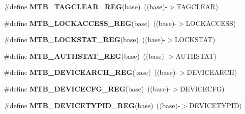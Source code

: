 \begin{DoxyCompactItemize}
\item 
\mbox{\label{group___m_t_b___register___accessor___macros_ga14fdf038658b290f905867b2b745c629}} 
\#define {\bfseries M\+T\+B\+\_\+\+T\+A\+G\+C\+L\+E\+A\+R\+\_\+\+R\+EG}(base)~((base)-\/$>$T\+A\+G\+C\+L\+E\+AR)
\item 
\mbox{\label{group___m_t_b___register___accessor___macros_gaf0943d71afa518f65cec97557400a04a}} 
\#define {\bfseries M\+T\+B\+\_\+\+L\+O\+C\+K\+A\+C\+C\+E\+S\+S\+\_\+\+R\+EG}(base)~((base)-\/$>$L\+O\+C\+K\+A\+C\+C\+E\+SS)
\item 
\mbox{\label{group___m_t_b___register___accessor___macros_ga46969ca43e5680eefbd36c829c1194a1}} 
\#define {\bfseries M\+T\+B\+\_\+\+L\+O\+C\+K\+S\+T\+A\+T\+\_\+\+R\+EG}(base)~((base)-\/$>$L\+O\+C\+K\+S\+T\+AT)
\item 
\mbox{\label{group___m_t_b___register___accessor___macros_gab2cb70e8dbcd3c7e0befc4adc320361c}} 
\#define {\bfseries M\+T\+B\+\_\+\+A\+U\+T\+H\+S\+T\+A\+T\+\_\+\+R\+EG}(base)~((base)-\/$>$A\+U\+T\+H\+S\+T\+AT)
\item 
\mbox{\label{group___m_t_b___register___accessor___macros_gaee07e23608c4ed76b2b145ba15f98cf4}} 
\#define {\bfseries M\+T\+B\+\_\+\+D\+E\+V\+I\+C\+E\+A\+R\+C\+H\+\_\+\+R\+EG}(base)~((base)-\/$>$D\+E\+V\+I\+C\+E\+A\+R\+CH)
\item 
\mbox{\label{group___m_t_b___register___accessor___macros_ga60039245faedb5ba2ff9273bcd6114be}} 
\#define {\bfseries M\+T\+B\+\_\+\+D\+E\+V\+I\+C\+E\+C\+F\+G\+\_\+\+R\+EG}(base)~((base)-\/$>$D\+E\+V\+I\+C\+E\+C\+FG)
\item 
\mbox{\label{group___m_t_b___register___accessor___macros_gae7ac311868bb09e22c9d90571eb1a174}} 
\#define {\bfseries M\+T\+B\+\_\+\+D\+E\+V\+I\+C\+E\+T\+Y\+P\+I\+D\+\_\+\+R\+EG}(base)~((base)-\/$>$D\+E\+V\+I\+C\+E\+T\+Y\+P\+ID)
\item 
\mbox{\label{group___m_t_b___register___accessor___macros_ga1c831bceebde1093b9603f4c5d5001fa}} 

\end{DoxyCompactItemize}

